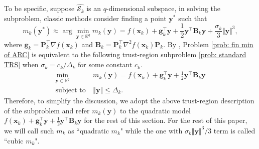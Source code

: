 \documentclass[colorlinks=true, linkcolor=blue, citecolor=blue, urlcolor=blue]{article}
\theoremstyle{plain}
\theoremstyle{definition}
\theoremstyle{remark}
\begin{document}
To be specific, suppose $\hat{\mathcal{S}_k}$ is an $q$-dimensional subspace, in solving the subproblem, classic methods consider finding a point $\bm y^*$ such that
\begin{equation}\label{prob: fin min of ARC}
    m_k(\bm y^*)\approx\arg\min_{\bm y\in\mathbb{R}^q}m_k(\bm y)=f(\bm x_k)+\bm{g}_k^\top\bm{y}+\frac{1}{2}\bm{y}^\top \bm{B}_k\bm{y}+\frac{\sigma_k}{3}\Vert \bm{y}\Vert^3,
\end{equation}
where $\bm g_k=\bm P_k^\top\nabla f(\bm x_k)$ and $\bm B_k=\bm P_k^\top\nabla^2f(\bm x_k)\bm P_k$. By \citet{CartisGouldToint2011}, Problem \eqref{prob: fin min of ARC} is equivalent to the following trust-region subproblem \eqref{prob: standard TRS} when $\sigma_k=c_k/\Delta_k$ for some constant $c_k$.
\begin{equation}\label{prob: standard TRS}
   \begin{aligned}
     \min_{\bm y\in\mathbb{R}^q}\ &m_k(\bm y)=f(\bm x_k)+\bm{g}_k^\top\bm{y}+\frac{1}{2}\bm{y}^\top \bm{B}_k\bm{y}\\
    \text{subject to}\ & \bm \Vert \bm y\Vert
    \leq \Delta_k. 
\end{aligned} 
\end{equation}
Therefore, to simplify the discussion, we adopt the above trust-region description of the subproblem and refer $m_k(\bm y)$ to the quadratic model $f(\bm x_k)+\bm{g}_k^\top\bm{y}+\frac{1}{2}\bm{y}^\top \bm{B}_k\bm{y}$ for the rest of this section. For the rest of this paper, we will call such $m_k$ as ``quadratic $m_k$" while the one with $\sigma_k\Vert \bm y\Vert^3/3$ term is called ``cubic $m_k$".
\end{document}
